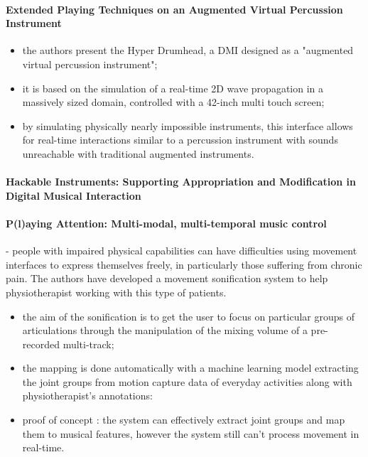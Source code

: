 \documentclass[11pt]{article}
\begin{document}
\paragraph{Extended Playing Techniques on an Augmented Virtual Percussion Instrument} \citep{zappi_dimensionality_2014}
\begin{itemize}
    \item the authors present the Hyper Drumhead, a DMI designed as a "augmented virtual percussion instrument";
    \item it is based on the simulation of a real-time 2D wave propagation in a massively sized domain, controlled with a 42-inch multi touch screen;
    \item by simulating physically nearly impossible instruments, this interface allows for real-time interactions similar to a percussion instrument with sounds unreachable with traditional augmented instruments.
\end{itemize}

\paragraph{Hackable Instruments: Supporting Appropriation and Modification in Digital Musical Interaction} \citep{zappi_dimensionality_2014}


\paragraph{P(l)aying Attention: Multi-modal, multi-temporal music control} \citep{gold_playing_2020} - people with impaired physical capabilities can have difficulties using movement interfaces to express themselves freely, in particularly those suffering from chronic pain. The authors have developed a movement sonification system to help physiotherapist working with this type of patients.
\begin{itemize}
    \item the aim of the sonification is to get the user to focus on particular groups of articulations through the manipulation of the mixing volume of a pre-recorded multi-track;
    \item the mapping is done automatically with a machine learning model extracting the joint groups from motion capture data of everyday activities along with physiotherapist's annotations: 
    \item proof of concept : the system can effectively extract joint groups and map them to musical features, however the system still can't process movement in real-time.
\end{itemize}
\end{document}
